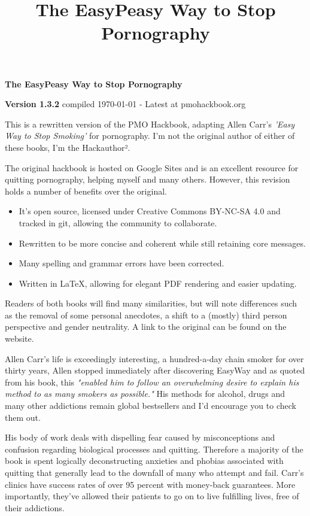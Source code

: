 \documentclass[easypeasy.tex]{subfiles}
\title {The EasyPeasy Way to Stop Pornography}
\begin{document}
\thispagestyle{empty}

\begin{center}
  {\Huge\bfseries The EasyPeasy Way to Stop Pornography \par}
  {\small \textbf{Version 1.3.2} compiled {\today} - Latest at pmohackbook.org}
\end{center}

This is a rewritten version of the PMO Hackbook, adapting Allen Carr's \textit{'Easy Way to Stop Smoking'} for pornography. I'm not the original author of either of these books, I'm the Hackauthor².

The original hackbook is hosted on Google Sites and is an excellent resource for quitting pornography, helping myself and many others. However, this revision holds a number of benefits over the original.
\begin{itemize}
\item It's open source, licensed under Creative Commons BY-NC-SA 4.0 and tracked in git, allowing the community to collaborate.
\item Rewritten to be more concise and coherent while still retaining core messages.
\item Many spelling and grammar errors have been corrected.
\item Written in LaTeX, allowing for elegant PDF rendering and easier updating.
\end{itemize}

Readers of both books will find many similarities, but will note differences such as the removal of some personal anecdotes, a shift to a (mostly) third person perspective and gender neutrality. A link to the original can be found on the website.

Allen Carr's life is exceedingly interesting, a hundred-a-day chain smoker for over thirty years, Allen stopped immediately after discovering EasyWay and as quoted from his book, this \textit{"enabled him to follow an overwhelming desire to explain his method to as many smokers as possible."} His methods for alcohol, drugs and many other addictions remain global bestsellers and I'd encourage you to check them out.

His body of work deals with dispelling fear caused by misconceptions and confusion regarding biological processes and quitting. Therefore a majority of the book is spent logically deconstructing anxieties and phobias associated with quitting that generally lead to the downfall of many who attempt and fail. Carr's clinics have success rates of over 95 percent with money-back guarantees. More importantly, they've allowed their patients to go on to live fulfilling lives, free of their addictions.
\end{document}
